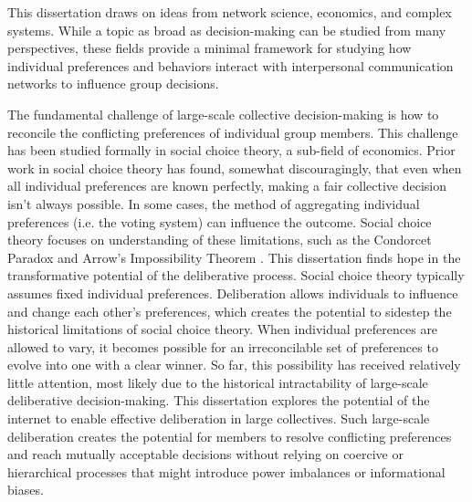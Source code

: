 This dissertation draws on ideas from network science, economics, and complex
systems.
While a topic as broad as decision-making can be studied from many perspectives,
these fields provide a minimal framework for studying how individual preferences
and behaviors interact with interpersonal communication networks to influence
group decisions.

The fundamental challenge of large-scale collective decision-making is how to
reconcile the conflicting preferences of individual group members.
This challenge has been studied formally in social choice theory,
a sub-field of economics.
Prior work in social choice theory has found, somewhat discouragingly,
that even when all individual preferences are known perfectly,
making a fair collective decision isn't always possible.
In some cases, the method of aggregating individual preferences
(i.e. the voting system) can influence the outcome.
Social choice theory focuses on understanding of these limitations,
such as the Condorcet Paradox
\cite{condorcet_essay_1785} and
Arrow's Impossibility Theorem \cite{arrow_social_2012}.
This dissertation finds hope in the transformative potential of the
deliberative process.
Social choice theory typically assumes fixed individual preferences.
Deliberation allows individuals to influence and change each other's
preferences,
which creates the potential to sidestep the historical limitations of
social choice theory.
When individual preferences are allowed to vary, it becomes possible for an
irreconcilable set of preferences to evolve into one with a clear winner.
So far, this possibility has received relatively little attention,
most likely due to the historical intractability of large-scale deliberative
decision-making.
This dissertation explores the potential of the internet to enable effective
deliberation in large collectives.
Such large-scale deliberation creates the potential for members to
resolve conflicting preferences and reach mutually acceptable decisions
without relying on coercive or hierarchical processes that might introduce
power imbalances or informational biases.

